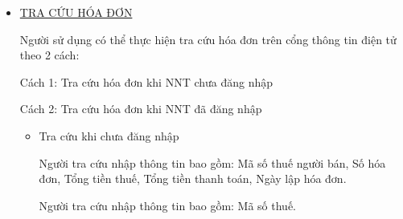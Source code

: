 \begin{itemize}
    \item \underline{TRA CỨU HÓA ĐƠN}

          Người sử dụng có thể thực hiện tra cứu hóa đơn trên cổng thông tin điện tử theo 2 cách:

          Cách 1: Tra cứu hóa đơn khi NNT chưa đăng nhập

          Cách 2: Tra cứu hóa đơn khi NNT đã đăng nhập

          \begin{itemize}

              \item Tra cứu khi chưa đăng nhập


                    Người tra cứu nhập thông tin bao gồm: Mã số thuế người bán, Số hóa đơn, Tổng tiền thuế, Tổng tiền thanh toán, Ngày lập hóa đơn.






                    Người tra cứu nhập thông tin bao gồm: Mã số thuế.





\end{itemize}
\end{itemize}
